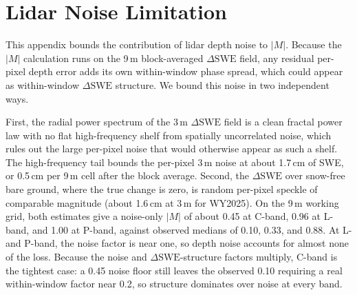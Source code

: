 \documentclass[tc, manuscript]{copernicus}
\begin{document}










\appendix
\section{Lidar Noise Limitation}\label{appendix:noise}    %

This appendix bounds the contribution of lidar depth noise to $|M|$. Because the $|M|$ calculation runs on the 9\,\unit{m} block-averaged $\Delta\mathrm{SWE}$ field, any residual per-pixel depth error adds its own within-window phase spread, which could appear as within-window $\Delta\mathrm{SWE}$ structure. We bound this noise in two independent ways.

First, the radial power spectrum of the 3\,\unit{m} $\Delta\mathrm{SWE}$ field is a clean fractal power law with no flat high-frequency shelf from spatially uncorrelated noise, which rules out the large per-pixel noise that would otherwise appear as such a shelf. The high-frequency tail bounds the per-pixel 3\,\unit{m} noise at about 1.7\,\unit{cm} of SWE, or 0.5\,\unit{cm} per 9\,\unit{m} cell after the block average. Second, the $\Delta\mathrm{SWE}$ over snow-free bare ground, where the true change is zero, is random per-pixel speckle of comparable magnitude (about 1.6\,\unit{cm} at 3\,\unit{m} for WY2025). On the 9\,\unit{m} working grid, both estimates give a noise-only $|M|$ of about 0.45 at C-band, 0.96 at L-band, and 1.00 at P-band, against observed medians of 0.10, 0.33, and 0.88. At L- and P-band, the noise factor is near one, so depth noise accounts for almost none of the loss. Because the noise and $\Delta\mathrm{SWE}$-structure factors multiply, C-band is the tightest case: a 0.45 noise floor still leaves the observed 0.10 requiring a real within-window factor near 0.2, so structure dominates over noise at every band.
\end{document}
